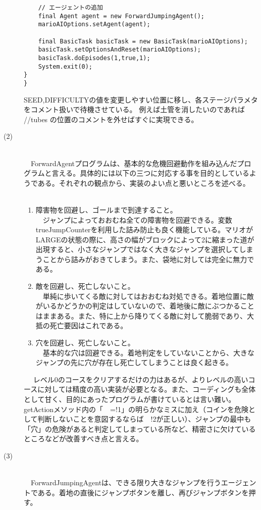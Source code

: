 \documentclass[a4j]{jarticle}
\begin{document}
\begin{description}
\begin{verbatim}
    // エージェントの追加
    final Agent agent = new ForwardJumpingAgent();
    marioAIOptions.setAgent(agent);
    
    final BasicTask basicTask = new BasicTask(marioAIOptions);
    basicTask.setOptionsAndReset(marioAIOptions);
    basicTask.doEpisodes(1,true,1);
    System.exit(0);
}
}
\end{verbatim}

SEED,DIFFICULTYの値を変更しやすい位置に移し、各ステージパラメタをコメント扱いで待機させている。
例えば土管を消したいのであれば //tubes の位置のコメントを外せばすぐに実現できる。
\item[(2)]~\\
　ForwardAgentプログラムは、基本的な危機回避動作を組み込んだプログラムと言える。具体的には以下の三つに対応する事を目的としているようである。それぞれの観点から、実装のよい点と悪いところを述べる。
　\begin{enumerate}
  \item 障害物を回避し、ゴールまで到達すること。~\\
　ジャンプによっておおむね全ての障害物を回避できる。変数trueJumpCounterを利用した詰み防止も良く機能している。マリオがLARGEの状態の際に、高さの幅がブロックによって2に縮まった道が出現すると、小さなジャンプではなく大きなジャンプを選択してしまうことから詰みがおきてしまう。また、袋地に対しては完全に無力である。
　\item 敵を回避し、死亡しないこと。~\\
　単純に歩いてくる敵に対してはおおむね対処できる。着地位置に敵がいるかどうかの判定はしていないので、着地後に敵にぶつかることはままある。また、特に上から降りてくる敵に対して脆弱であり、大抵の死亡要因はこれである。
　\item 穴を回避し、死亡しないこと。~\\
　基本的な穴は回避できる。着地判定をしていないことから、大きなジャンプの先に穴が存在し死亡してしまうことは良く起きる。
  \end{enumerate}
　
レベル0のコースをクリアするだけの力はあるが、よりレベルの高いコースに対しては精度の高い実装が必要となる。また、コーディングも全体として甘く、目的にあったプログラムが書けているとは言い難い。getActionメソッド内の「~~=!1」の明らかなミスに加え（コインを危険として判断しないことを意図するならば~~!2が正しい）、ジャンプの最中も「穴」の危険があると判定してしまっている所など、精密さに欠けているところなどが改善すべき点と言える。
\item[(3)]~\\
　ForwardJumpingAgentは、できる限り大きなジャンプを行うエージェントである。着地の直後にジャンプボタンを離し、再びジャンプボタンを押す。


\end{description}
\end{document}
